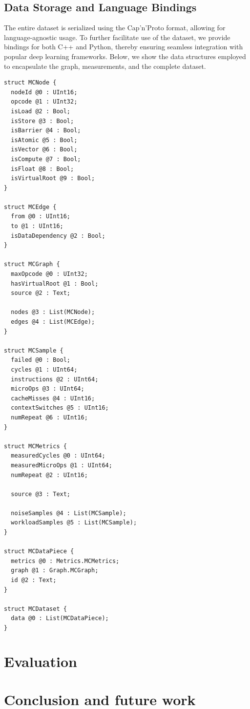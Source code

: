 \subsection{Data Storage and Language Bindings}

The entire dataset is serialized using the Cap'n'Proto format, allowing for language-agnostic usage. To further facilitate use of the dataset, we provide bindings for both C++ and Python, thereby ensuring seamless integration with popular deep learning frameworks. Below, we show the data structures employed to encapsulate the graph, measurements, and the complete dataset.

\begin{lstlisting}
struct MCNode {
  nodeId @0 : UInt16;
  opcode @1 : UInt32;
  isLoad @2 : Bool;
  isStore @3 : Bool;
  isBarrier @4 : Bool;
  isAtomic @5 : Bool;
  isVector @6 : Bool;
  isCompute @7 : Bool;
  isFloat @8 : Bool;
  isVirtualRoot @9 : Bool;
}

struct MCEdge {
  from @0 : UInt16;
  to @1 : UInt16;
  isDataDependency @2 : Bool;
}

struct MCGraph {
  maxOpcode @0 : UInt32;
  hasVirtualRoot @1 : Bool;
  source @2 : Text;

  nodes @3 : List(MCNode);
  edges @4 : List(MCEdge);
}

struct MCSample {
  failed @0 : Bool;
  cycles @1 : UInt64;
  instructions @2 : UInt64;
  microOps @3 : UInt64;
  cacheMisses @4 : UInt16;
  contextSwitches @5 : UInt16;
  numRepeat @6 : UInt16;
}

struct MCMetrics {
  measuredCycles @0 : UInt64;
  measuredMicroOps @1 : UInt64;
  numRepeat @2 : UInt16;

  source @3 : Text;

  noiseSamples @4 : List(MCSample);
  workloadSamples @5 : List(MCSample);
}

struct MCDataPiece {
  metrics @0 : Metrics.MCMetrics;
  graph @1 : Graph.MCGraph;
  id @2 : Text;
}

struct MCDataset {
  data @0 : List(MCDataPiece);
}
\end{lstlisting}

\section{Evaluation}


\section{Conclusion and future work}

